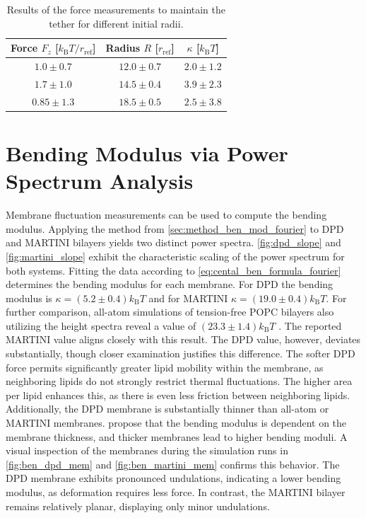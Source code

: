 \documentclass[
    11pt,
    a4paper,
    oneside,        %
    BCOR=10mm,      %
    parskip=half,   %
    listof=nototoc,   %
    bibliography=totoc %
]{scrreprt}
\begin{document}
\begin{table}[t]
\centering
\begin{tabular}{ccc}
    \toprule
    Force $F_z$ [$k_\text{B}T/r_\text{ref}$] & Radius $R$ [$r_\text{ref}$] & $\kappa$ [$k_\text{B}T$]\\
    \midrule
    $1.0 \pm 0.7$ & $12.0 \pm 0.7$ & $2.0 \pm 1.2$ \\
    $1.7 \pm 1.0$ & $14.5 \pm 0.4$ & $3.9 \pm 2.3$ \\
    $0.85 \pm 1.3$ & $18.5 \pm 0.5$ & $2.5 \pm 3.8$ \\
    \bottomrule 
\end{tabular}
\caption{Results of the force measurements to maintain the tether for different initial radii.}
\label{tab:tether_results}
\end{table}

\section{Bending Modulus via Power Spectrum Analysis}

Membrane fluctuation measurements can be used to compute the bending modulus. Applying the method from \cref{sec:method_ben_mod_fourier} to DPD and MARTINI bilayers yields two distinct power spectra. \cref{fig:dpd_slope} and \cref{fig:martini_slope} exhibit the characteristic scaling of the power spectrum for both systems. Fitting the data according to \cref{eq:cental_ben_formula_fourier} determines the bending modulus for each membrane. For DPD the bending modulus is $\kappa = (5.2 \pm 0.4)k_\text{B}T$ and for MARTINI $\kappa = (19.0 \pm 0.4)k_\text{B}T$. For further comparison, all-atom simulations of tension-free POPC bilayers also utilizing the height spectra reveal a value of $(23.3 \pm 1.4)k_\text{B}T$ \cite{all_atom_bending}. The reported MARTINI value aligns closely with this result. The DPD value, however, deviates substantially, though closer examination justifies this difference. The softer DPD force permits significantly greater lipid mobility within the membrane, as neighboring lipids do not strongly restrict thermal fluctuations. The higher area per lipid enhances this, as there is even less friction between neighboring lipids. Additionally, the DPD membrane is substantially thinner than all-atom or MARTINI membranes. \citeauthor{bending_thickness} \cite{bending_thickness} propose that the bending modulus is dependent on the membrane thickness, and thicker membranes lead to higher bending moduli. A visual inspection of the membranes during the simulation runs in \cref{fig:ben_dpd_mem} and \cref{fig:ben_martini_mem} confirms this behavior. The DPD membrane exhibits pronounced undulations, indicating a lower bending modulus, as deformation requires less force. In contrast, the MARTINI bilayer remains relatively planar, displaying only minor undulations. 
\end{document}
